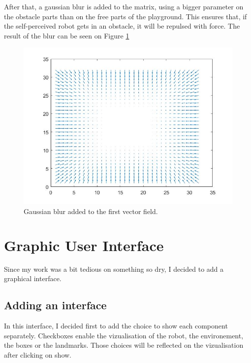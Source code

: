  After that, a gaussian blur is added to the matrix, using a bigger parameter on the obstacle parts than on the free parts of the playground.
 This ensures that, if the self-perceived robot gets in an obstacle, it will be repulsed with force.
 The result of the blur can be seen on Figure \ref{fig:quiver2}\\

 \begin{figure}[ht]
 \centering
 \includegraphics[scale=0.4]{Figures/quiver2}
 \decoRule
 \caption[Blurred Quiver]{Gaussian blur added to the first vector field.}
 \label{fig:quiver2}
 \end{figure}

%

\section{Graphic User Interface}

Since my work was a bit tedious on something so dry, I decided to add a graphical interface.

\subsection{Adding an interface}

In this interface, I decided first to add the choice to show each component separately. Checkboxes enable the vizualisation of the robot, the environement, the boxes or the landmarks.
Those choices will be reflected on the vizualisation after clicking on show.\\

